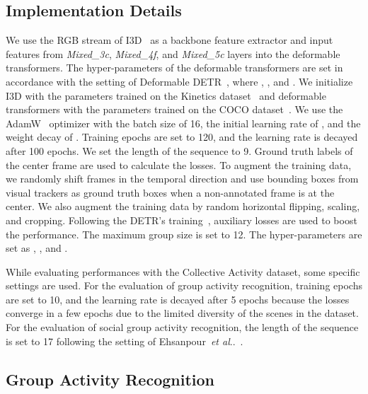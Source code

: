 \documentclass[runningheads]{llncs}
\makeatletter
\DeclareRobustCommand\onedot{\futurelet\@let@token\@onedot}
\def\@onedot{\ifx\@let@token.\else.\null\fi\xspace}
\def\etal{\emph{et al}\onedot}
\makeatother
\begin{document}
\subsection{Implementation Details}

We use the RGB stream of I3D~\cite{carreira_cvpr2017} as a backbone feature extractor and input features from \textit{Mixed\_3c}, \textit{Mixed\_4f}, and \textit{Mixed\_5c} layers into the deformable transformers. The hyper-parameters of the deformable transformers are set in accordance with the setting of Deformable DETR~\cite{zhu_iclr2021}, where , , and . We initialize I3D with the parameters trained on the Kinetics dataset~\cite{kay_arxiv2017} and deformable transformers with the parameters trained on the COCO dataset~\cite{lin_eccv2014}. We use the AdamW~\cite{loshchiloy_iclr2019} optimizer with the batch size of 16, the initial learning rate of , and the weight decay of . Training epochs are set to 120, and the learning rate is decayed after 100 epochs. We set the length of the sequence  to 9. Ground truth labels of the center frame are used to calculate the losses. To augment the training data, we randomly shift frames in the temporal direction and use bounding boxes from visual trackers as ground truth boxes when a non-annotated frame is at the center. We also augment the training data by random horizontal flipping, scaling, and cropping. Following the DETR's training~\cite{carion_eccv2020}, auxiliary losses are used to boost the performance. The maximum group size  is set to 12. The hyper-parameters are set as , , and .

While evaluating performances with the Collective Activity dataset, some specific settings are used. For the evaluation of group activity recognition, training epochs are set to 10, and the learning rate is decayed after 5 epochs because the losses converge in a few epochs due to the limited diversity of the scenes in the dataset. For the evaluation of social group activity recognition, the length of the sequence  is set to 17 following the setting of Ehsanpour~\etal~\cite{ehsanpour_eccv2020}.

\subsection{Group Activity Recognition}
\end{document}
